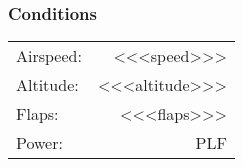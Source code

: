 % 
% 
%
 \subsubsection*{Conditions}
 \noindent\begin{tabular}{p{1.5 in}r}
 Airspeed:&<<<speed>>>\\
 Altitude:&<<<altitude>>>\\
 Flaps:&<<<flaps>>>\\
 Power:&PLF\\
 \end{tabular}
